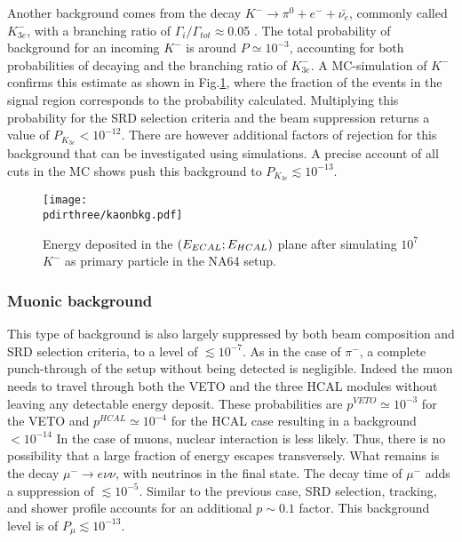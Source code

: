 Another background comes from the decay $K^- \rightarrow \pi^0 + e^- + \bar{\nu_e}$, commonly called $K^-_{3e}$, with a branching ratio of $\Gamma_i/\Gamma_{tot} \approx$0.05 \cite{particle-strange-mesons}. The total probability of background for an incoming $K^-$ is around $P\simeq 10^{-3}$, accounting for both probabilities of decaying and the branching ratio of $K^-_{3e}$. A MC-simulation of $K^-$ confirms this estimate as shown in Fig.\ref{fig:kaonbkg-sim}, where the fraction of the events in the signal region corresponds to the probability calculated. 
Multiplying this probability for the SRD selection criteria and the beam suppression returns a value of $P_{K_{3e}} < 10^{-12}$.
There are however additional factors of rejection for this background that can be investigated using simulations. A precise account of all cuts in the MC shows push this background to $P_{K_{3e}} \lesssim 10^{-13}$.


\begin{figure}[bth!]
  \centering
  \texttt{[image: \\pdirthree/kaonbkg.pdf]}
  \caption[$K^-$ simulation ]{Energy deposited in the $(E_{ECAL};E_{HCAL})$ plane after simulating $10^7$ $K^-$ as primary particle in the NA64 setup.}
  \label{fig:kaonbkg-sim}
\end{figure}

\subsubsection{Muonic background}
\label{ch3:sec:bkg:inv:muon}

This type of background is also largely suppressed by both beam composition and SRD selection criteria, to a level of
$\lesssim 10^{-7}$. As in the case of $\pi^-$, a complete punch-through of the setup without being detected is negligible. Indeed the muon needs to travel through both the VETO and the three HCAL modules without leaving any detectable energy deposit. These probabilities are $p^{VETO} \simeq 10^{-3}$ for the VETO and $p^{HCAL} \simeq 10^{-4}$ for the HCAL case resulting in a background $< 10^{-14}$
In the case of muons, nuclear interaction is less likely. Thus, there is no possibility that a large fraction of energy escapes transversely. 
What remains is the decay $\mu^- \rightarrow e\nu\nu$, with neutrinos in the final state. The decay time of $\mu^-$ adds a suppression of $\lesssim 10^{-5}$. Similar to the previous case, SRD selection, tracking, and shower profile accounts for an additional $p\sim 0.1$ factor. This background level is of $P_{\mu} \lesssim 10^{-13}$.

